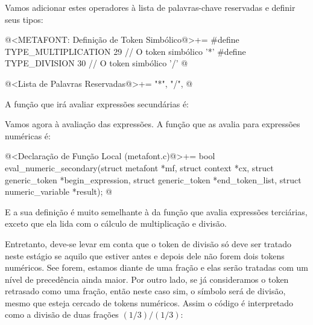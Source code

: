 Vamos adicionar estes operadores à lista de palavras-chave reservadas
e definir seus tipos:

\iniciocodigo
@<METAFONT: Definição de Token Simbólico@>+=
#define TYPE_MULTIPLICATION        29 // O token simbólico '*'
#define TYPE_DIVISION              30 // O token simbólico '/'
@
\fimcodigo

\iniciocodigo
@<Lista de Palavras Reservadas@>+=
"*", "/",
@
\fimcodigo

A função que irá avaliar expressões secundárias é:

Vamos agora à avaliação das expressões. A função que as avalia para
expressões numéricas é:

\iniciocodigo
@<Declaração de Função Local (metafont.c)@>+=
bool eval_numeric_secondary(struct metafont *mf, struct context *cx,
                            struct generic_token *begin_expression,
                            struct generic_token *end_token_list,
                            struct numeric_variable *result);
@
\fimcodigo

E a sua definição é muito semelhante à da função que avalia expressões
terciárias, exceto que ela lida com o cálculo de multiplicação e
divisão.

Entretanto, deve-se levar em conta que o token de divisão só deve ser
tratado neste estágio se aquilo que estiver antes e depois dele não
forem dois tokens numéricos. See forem, estamos diante de uma fração e
elas serão tratadas com um nível de precedência ainda maior. Por outro
lado, se já consideramos o token retrasado como uma fração, então
neste caso sim, o símbolo será de divisão, mesmo que esteja cercado de
tokens numéricos. Assim o código  é interpretado
como a divisão de duas frações $(1/3)/(1/3)$:


